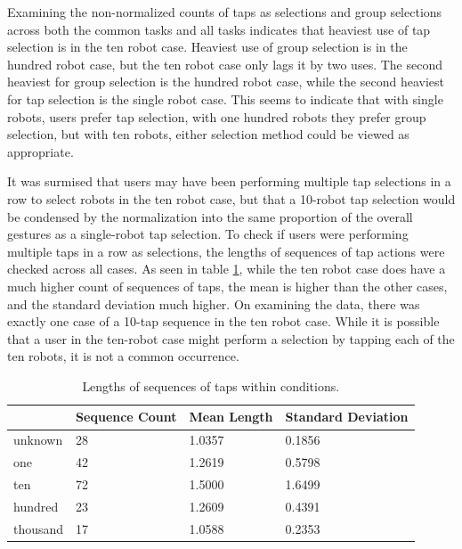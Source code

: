 Examining the non-normalized counts of taps as selections and group selections across both the common tasks and all tasks indicates that heaviest use of tap selection is in the ten robot case. Heaviest use of group selection is in the hundred robot case, but the ten robot case only lags it by two uses. The second heaviest for group selection is the hundred robot case, while the second heaviest for tap selection is the single robot case. This seems to indicate that with single robots, users prefer tap selection, with one hundred robots they prefer group selection, but with ten robots, either selection method could be viewed as appropriate. 

It was surmised that users may have been performing multiple tap selections in a row to select robots in the ten robot case, but that a 10-robot tap selection would be condensed by the normalization into the same proportion of the overall gestures as a single-robot tap selection. 
To check if users were performing multiple taps in a row as selections, the lengths of sequences of tap actions were checked across all cases. 
As seen in table \ref{tab:tap_seq_len}, while the ten robot case does have a much higher count of sequences of taps, the mean is higher than the other cases, and the standard deviation much higher. 
On examining the data, there was exactly one case of a 10-tap sequence in the ten robot case.
While it is possible that a user in the ten-robot case might perform a selection by tapping each of the ten robots, it is not a common occurrence. 

\begin{table}
	\begin{tabular}{l | l l l}
		& Sequence Count & Mean Length & Standard Deviation \\ 
		\hline
		unknown & 28 & 1.0357 & 0.1856 \\
		one & 42 & 1.2619 & 0.5798\\
		ten & 72 & 1.5000 & 1.6499\\
		hundred & 23 & 1.2609 & 0.4391\\
		thousand & 17 & 1.0588 & 0.2353\\
	\end{tabular}
	\caption{Lengths of sequences of taps within conditions.}
	\label{tab:tap_seq_len}
\end{table}

